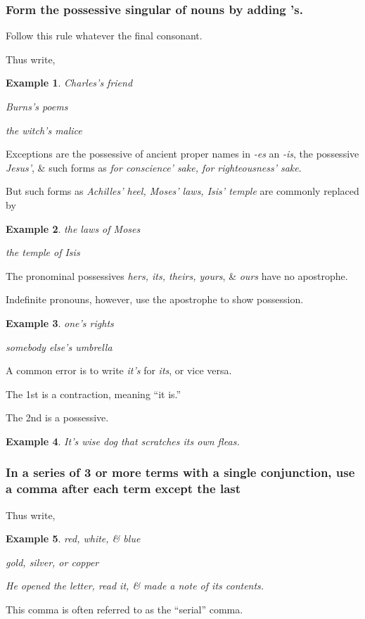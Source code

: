 \documentclass{article}
\newtheorem{example}{Example}
\begin{document}
\subsubsection{Form the possessive singular of nouns by adding 's.}
Follow this rule whatever the final consonant.

Thus write,
\begin{example}
	Charles's friend
	
	Burns's poems
	
	the witch's malice
\end{example}
Exceptions are the possessive of ancient proper names in {\it -es} an {\it -is}, the possessive {\it Jesus'}, \& such forms as {\it for conscience' sake, for righteousness' sake}.

But such forms as {\it Achilles' heel, Moses' laws, Isis' temple} are commonly replaced by
\begin{example}
	the laws of Moses
	
	the temple of Isis
\end{example}
The pronominal possessives {\it hers, its, theirs, yours}, \& {\it ours} have no apostrophe.

Indefinite pronouns, however, use the apostrophe to show possession.
\begin{example}
	one's rights
	
	somebody else's umbrella
\end{example}
A common error is to write {\it it's} for {\it its}, or vice versa.

The 1st is a contraction, meaning ``it is.''

The 2nd is a possessive.
\begin{example}
	It's wise dog that scratches its own fleas.
\end{example}


\subsubsection{In a series of 3 or more terms with a single conjunction, use a comma after each term except the last}
Thus write,
\begin{example}
	red, white, \& blue
	
	gold, silver, or copper
	
	He opened the letter, read it, \& made a note of its contents.
\end{example}
This comma is often referred to as the ``serial'' comma.
\end{document}
